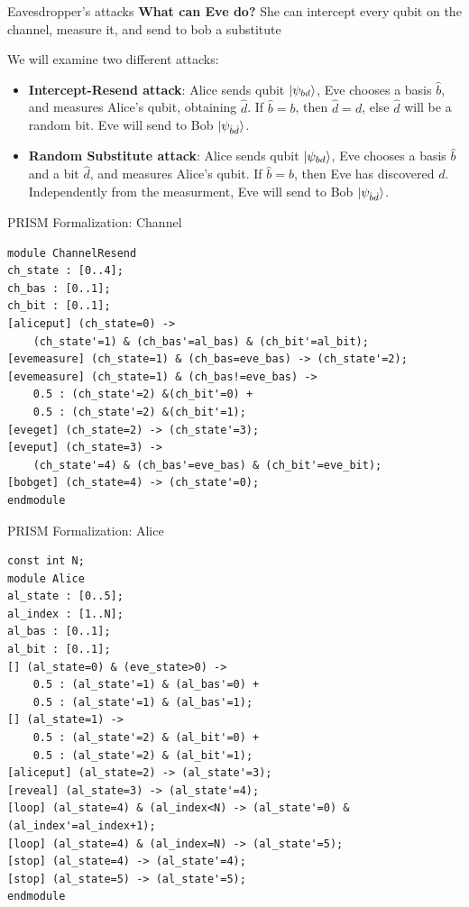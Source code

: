 \documentclass{beamer}
\begin{document}
\begin{frame}{Eavesdropper's attacks}
	\textbf{What can Eve do?} She can intercept every qubit on the channel, measure it, and send to bob a substitute
	
	
	We will examine two different attacks: 
	\begin{itemize}\pause
		\item \textbf{Intercept-Resend attack}: Alice sends qubit $\ket{\psi_{bd}}$, Eve chooses a basis $\hat{b}$, and measures Alice's qubit, obtaining $\hat{d}$. If $\hat{b} = b$, then $\hat{d} = d$, else $\hat{d}$ will be a random bit. Eve will send to Bob $\ket{\psi_{\hat{b}\hat{d}}}$.
		\pause\item \textbf{Random Substitute attack}: Alice sends qubit $\ket{\psi_{bd}}$, Eve chooses a basis $\hat{b}$ and a bit $\hat{d}$, and measures Alice's qubit. If $\hat{b} = b$, then Eve has discovered $d$. Independently from the measurment, Eve will send to Bob $\ket{\psi_{\hat{b}\hat{d}}}$.
	\end{itemize}
\end{frame}

\begin{frame}[fragile]{PRISM Formalization: Channel}
\begin{scriptsize}
\begin{verbatim}
module ChannelResend
ch_state : [0..4];
ch_bas : [0..1];
ch_bit : [0..1];
[aliceput] (ch_state=0) ->
    (ch_state'=1) & (ch_bas'=al_bas) & (ch_bit'=al_bit);
[evemeasure] (ch_state=1) & (ch_bas=eve_bas) -> (ch_state'=2);
[evemeasure] (ch_state=1) & (ch_bas!=eve_bas) -> 
    0.5 : (ch_state'=2) &(ch_bit'=0) +
    0.5 : (ch_state'=2) &(ch_bit'=1);
[eveget] (ch_state=2) -> (ch_state'=3);
[eveput] (ch_state=3) ->
    (ch_state'=4) & (ch_bas'=eve_bas) & (ch_bit'=eve_bit);
[bobget] (ch_state=4) -> (ch_state'=0);
endmodule
\end{verbatim}
\end{scriptsize}
\end{frame}

\begin{frame}[fragile]{PRISM Formalization: Alice}
\begin{scriptsize}
\begin{verbatim}
const int N;
module Alice
al_state : [0..5];
al_index : [1..N];
al_bas : [0..1];
al_bit : [0..1];
[] (al_state=0) & (eve_state>0) -> 
    0.5 : (al_state'=1) & (al_bas'=0) +
    0.5 : (al_state'=1) & (al_bas'=1);
[] (al_state=1) -> 
    0.5 : (al_state'=2) & (al_bit'=0) +
    0.5 : (al_state'=2) & (al_bit'=1);
[aliceput] (al_state=2) -> (al_state'=3);
[reveal] (al_state=3) -> (al_state'=4);
[loop] (al_state=4) & (al_index<N) -> (al_state'=0) & (al_index'=al_index+1);
[loop] (al_state=4) & (al_index=N) -> (al_state'=5);
[stop] (al_state=4) -> (al_state'=4);
[stop] (al_state=5) -> (al_state'=5);
endmodule
\end{verbatim}
\end{scriptsize}
\end{frame}
\end{document}
